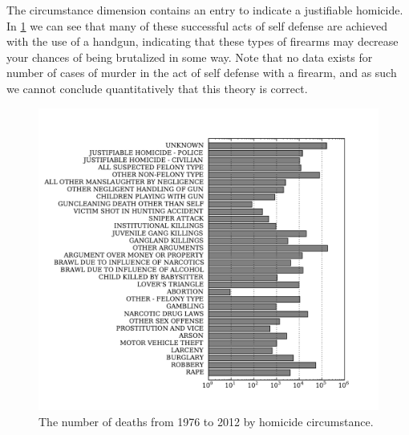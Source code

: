 \documentclass{evanarticle}
\begin{document}
The circumstance dimension contains an entry to indicate a justifiable homicide.
In \cref{fig_circumstance} we can see that many of these successful acts of self defense are achieved with the use of a handgun, indicating that these types of firearms may decrease your chances of being brutalized in some way.
Note that no data exists for number of cases of murder in the act of self defense with a firearm, and as such we cannot conclude quantitatively that this theory is correct.

\begin{figure}[H]
  \centering
    \includegraphics[width=\linewidth]{images/circumstance.pdf}
  \caption{The number of deaths from 1976 to 2012 by homicide circumstance.}
  \label{fig_circumstance}
\end{figure}
\end{document}
